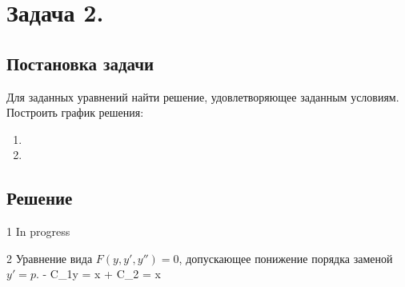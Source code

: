 

\section{Задача 2.}
\subsection{Постановка задачи}
Для заданных уравнений найти решение, удовлетворяющее заданным условиям.
Построить график решения:

\begin{enumerate}
    \item
    	\systemOfEquationFirst
    \item
		\systemOfEquationSecond
\end{enumerate}

\newpage

\subsection{Решение}
\begin{enumerate}
	\solutionItemSecond
		{1}
		{\systemOfEquationFirst}
		{In progress}
		{}
		{}
	
	\solutionItemSecond
		{2}
		{\systemOfEquationSecond}
		{
			Уравнение вида $ F(y, y', y'') = 0 $, 
			допускающее понижение порядка заменой $ y' = p $.
		}
		{ - C_1y = x + C_2}
		{ = x}
		
		
\end{enumerate}
